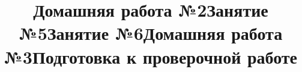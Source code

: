 \newpage
\title{Домашняя работа №2}
\begin{listofex}
	\item {}
	\item {}
	\item {}
	\item {}
	\item {}
	\item {}
	\item {}
\end{listofex}
\newpage
\title{Занятие №5}
\begin{listofex}
	\item {}
	\item {}
	\item {}
	\item {}
	\item {}
	\item {}
	\item {}
	\item {}
\end{listofex}
\newpage
\title{Занятие №6}
\begin{listofex}
	\item {}
	\item {}
	\item {}
	\item {}
	\item {}
	\item {}
	\item {}
	\item {}
	\item {}
\end{listofex}
\newpage
\title{Домашняя работа №3}
\begin{listofex}
	\item {}
	\item {}
	\item {}
	\item {}
	\item {}
	\item {}
	\item {}
\end{listofex}
\newpage
\title{Подготовка к проверочной работе}
